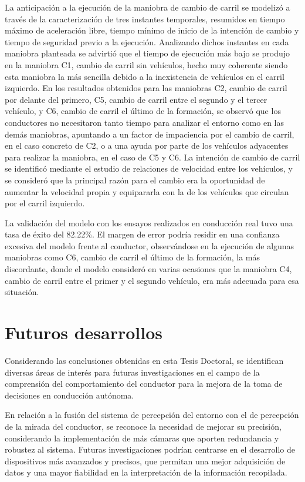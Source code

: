 La anticipación a la ejecución de la maniobra de cambio de carril se modelizó a través de la caracterización de tres instantes temporales, resumidos en tiempo máximo de aceleración libre, tiempo mínimo de inicio de la intención de cambio y tiempo de seguridad previo a la ejecución. Analizando dichos instantes en cada maniobra planteada se advirtió que el tiempo de ejecución más bajo se produjo en la maniobra C1, cambio de carril sin vehículos, hecho muy coherente siendo esta maniobra la más sencilla debido a la inexistencia de vehículos en el carril izquierdo. En los resultados obtenidos para las maniobras C2, cambio de carril por delante del primero, C5, cambio de carril entre el segundo y el tercer vehículo, y C6, cambio de carril el último de la formación, se observó que los conductores no necesitaron tanto tiempo para analizar el entorno como en las demás maniobras, apuntando a un factor de impaciencia por el cambio de carril, en el caso concreto de C2, o a una ayuda por parte de los vehículos adyacentes para realizar la maniobra, en el caso de C5 y C6. La intención de cambio de carril se identificó mediante el estudio de relaciones de velocidad entre los vehículos, y se consideró que la principal razón para el cambio era la oportunidad de aumentar la velocidad propia y equipararla con la de los vehículos que circulan por el carril izquierdo. 

La validación del modelo con los ensayos realizados en conducción real tuvo una tasa de éxito del 82.22\%. El margen de error podría residir en una confianza excesiva del modelo frente al conductor, observándose en la ejecución de algunas maniobras como C6, cambio de carril el último de la formación, la más discordante, donde el modelo consideró en varias ocasiones que la maniobra C4, cambio de carril entre el primer y el segundo vehículo, era más adecuada para esa situación.

\section{Futuros desarrollos}
Considerando las conclusiones obtenidas en esta Tesis Doctoral, se identifican diversas áreas de interés para futuras investigaciones en el campo de la comprensión del comportamiento del conductor para la mejora de la toma de decisiones en conducción autónoma.  

En relación a la fusión del sistema de percepción del entorno con el de percepción de la mirada del conductor, se reconoce la necesidad de mejorar su precisión, considerando la implementación de más cámaras que aporten redundancia y robustez al sistema. Futuras investigaciones podrían centrarse en el desarrollo de dispositivos más avanzados y precisos, que permitan una mejor adquisición de datos y una mayor fiabilidad en la interpretación de la información recopilada. 

